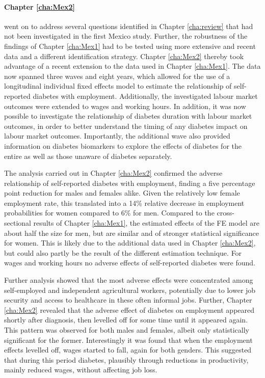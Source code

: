 \paragraph{Chapter \ref{cha:Mex2}}  went on to address several questions identified in Chapter \ref{cha:review} that had not been investigated in the first Mexico study. Further, the robustness of the findings of Chapter \ref{cha:Mex1} had to be tested using more extensive and recent data and a different identification strategy. Chapter \ref{cha:Mex2} thereby took advantage of a recent extension to the data used in Chapter \ref{cha:Mex1}. The data now spanned three waves and eight years, which allowed for the use of a longitudinal individual fixed effects model to estimate the relationship of self-reported diabetes with employment. Additionally, the investigated labour market outcomes were extended to wages and working hours. In addition, it was now possible to investigate the relationship of diabetes duration with labour market outcomes, in order to better understand the timing of any diabetes impact on labour market outcomes. Importantly, the additional wave also provided information on diabetes biomarkers to explore the effects of diabetes for the entire \DIFdelbegin {}\DIFdelend \DIFaddbegin {}\DIFaddend as well as those unaware of diabetes separately.

The analysis carried out in Chapter \ref{cha:Mex2} confirmed the adverse relationship of self-reported diabetes with employment, finding a five percentage point reduction for males and females alike. Given the relatively low female employment rate, this translated into a 14\% relative decrease in employment probabilities for women compared to 6\% for men. Compared to the cross-sectional results of Chapter \ref{cha:Mex1}, the estimated effects of the \ac{FE} model are about half the size for men, but are similar and of stronger statistical significance for women. This is likely due to the additional data used in Chapter \ref{cha:Mex2}, but could also partly be the result of the different estimation technique. For wages and working hours no adverse effects of self-reported diabetes were found.

Further analysis showed that the most adverse effects were concentrated among self-employed and independent agricultural workers, potentially due to lower job security and access to healthcare in these often informal jobs. Further, Chapter \ref{cha:Mex2} revealed that the adverse effect of diabetes on employment appeared shortly after diagnosis, then levelled off for some time until it appeared again. This pattern was observed for both males and females, albeit only statistically significant for the former. Interestingly it was found that when the employment effects levelled off, wages started to fall, again for both genders. This suggested that during this period diabetes, plausibly through reductions in productivity, mainly reduced wages, without affecting job loss.

